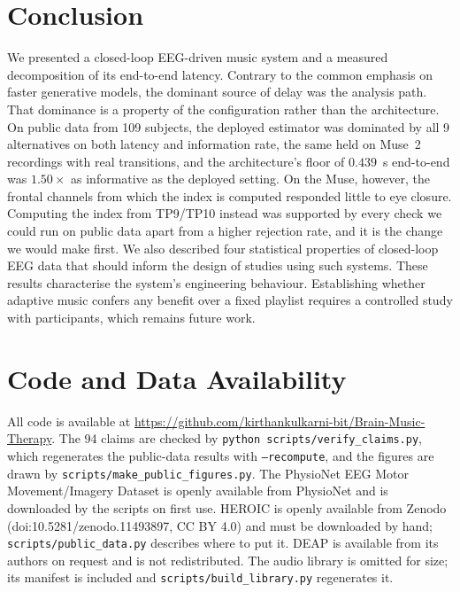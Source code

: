 \documentclass[11pt,a4paper]{article}
\begin{document}
\section{Conclusion}
\label{sec:conclusion}

We presented a closed-loop EEG-driven music system and a measured decomposition of its
end-to-end latency. Contrary to the common emphasis on faster generative models, the
dominant source of delay was the analysis path. That dominance is a property of the
configuration rather than the architecture. On public data from 109 subjects, the deployed
estimator was dominated by all 9 alternatives on both latency and information rate, the
same held on Muse~2 recordings with real transitions, and the architecture's floor of
$0.439$~s end-to-end was $1.50\times$ as informative as the deployed setting. On the Muse, however, the frontal channels from which the index is
computed responded little to eye closure. Computing the index from TP9/TP10 instead was
supported by every check we could run on public data apart from a higher rejection rate,
and it is the change we would make first. We also described four statistical properties
of closed-loop EEG data that should inform the design of studies using such systems. These results characterise
the system's engineering behaviour. Establishing whether adaptive music confers any benefit
over a fixed playlist requires a controlled study with participants, which remains future
work.

\section*{Code and Data Availability}

All code is available at
\url{https://github.com/kirthankulkarni-bit/Brain-Music-Therapy}. The 94 claims are checked
by \texttt{python scripts/verify\_claims.py}, which regenerates the public-data results
with \texttt{--recompute}, and the figures are drawn by
\texttt{scripts/make\_public\_figures.py}. The PhysioNet EEG Motor Movement/Imagery Dataset
is openly available from PhysioNet and is downloaded by the scripts on first use. HEROIC is
openly available from Zenodo (doi:10.5281/zenodo.11493897, CC BY 4.0) and must be
downloaded by hand; \texttt{scripts/public\_data.py} describes where to put it. DEAP is
available from its authors on request and is not redistributed. The audio library is
omitted for size; its manifest is included and \texttt{scripts/build\_library.py}
regenerates it.
\end{document}
